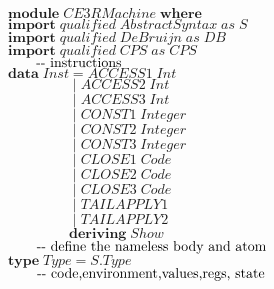 \documentclass[10pt]{article}
\newcommand{\Conid}[1]{\mathit{#1}}
\newcommand{\Varid}[1]{\mathit{#1}}
\begin{document}
\begin{hscode}\SaveRestoreHook
${\mathbf{module}\;\Conid{CE3RMachine}\;\mathbf{where}}$\\
${}$\\
${\mathbf{import}\;\Varid{qualified}\;\Conid{AbstractSyntax}\;\Varid{as}\;\Conid{S}}$\\
${\mathbf{import}\;\Varid{qualified}\;\Conid{DeBruijn}\;\Varid{as}\;\Conid{DB}}$\\
${\mathbf{import}\;\Varid{qualified}\;\Conid{CPS}\;\Varid{as}\;\Conid{CPS}}$\\
${}$\\
${}$\\
${\mbox{\qquad-{}- instructions}}$\\
${\mathbf{data}\;\Conid{Inst}\mathrel{=}\Conid{ACCESS1}\;\Conid{Int}}$\\
${\phantom{\mathbf{data}\;\Conid{Inst}\mbox{}}\mid \Conid{ACCESS2}\;\Conid{Int}}$\\
${\phantom{\mathbf{data}\;\Conid{Inst}\mbox{}}\mid \Conid{ACCESS3}\;\Conid{Int}}$\\
${\phantom{\mathbf{data}\;\Conid{Inst}\mbox{}}\mid \Conid{CONST1}\;\Conid{Integer}}$\\
${\phantom{\mathbf{data}\;\Conid{Inst}\mbox{}}\mid \Conid{CONST2}\;\Conid{Integer}}$\\
${\phantom{\mathbf{data}\;\Conid{Inst}\mbox{}}\mid \Conid{CONST3}\;\Conid{Integer}}$\\
${\phantom{\mathbf{data}\;\Conid{Inst}\mbox{}}\mid \Conid{CLOSE1}\;\Conid{Code}}$\\
${\phantom{\mathbf{data}\;\Conid{Inst}\mbox{}}\mid \Conid{CLOSE2}\;\Conid{Code}}$\\
${\phantom{\mathbf{data}\;\Conid{Inst}\mbox{}}\mid \Conid{CLOSE3}\;\Conid{Code}}$\\
${\phantom{\mathbf{data}\;\Conid{Inst}\mbox{}}\mid \Conid{TAILAPPLY1}}$\\
${\phantom{\mathbf{data}\;\Conid{Inst}\mbox{}}\mid \Conid{TAILAPPLY2}}$\\
${\phantom{\mathbf{data}\;\Conid{Inst}\mbox{}}\mathbf{deriving}\;\Conid{Show}}$\\
${}$\\
${}$\\
${\mbox{\qquad-{}- define the nameless body and atom}}$\\
${\mathbf{type}\;\Conid{Type}\mathrel{=}\Conid{\Conid{S}.Type}}$\\
${}$\\
${\mbox{\qquad-{}- code,environment,values,regs, state}}$\\

\end{hscode}
\end{document}
